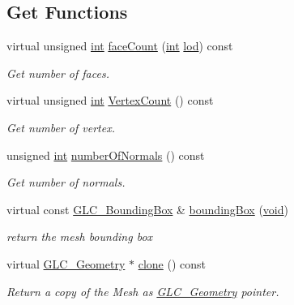 \subsection*{Get Functions}
\begin{DoxyCompactItemize}
\item 
virtual unsigned \hyperlink{ioapi_8h_a787fa3cf048117ba7123753c1e74fcd6}{int} \hyperlink{class_g_l_c___mesh_ac2db6e0b14be355770dbe8b815cde6bb}{face\-Count} (\hyperlink{ioapi_8h_a787fa3cf048117ba7123753c1e74fcd6}{int} \hyperlink{glext_8h_a5b5a34b88a28ab9c203c2b432f6168b6}{lod}) const 
\begin{DoxyCompactList}\small\item\em Get number of faces. \end{DoxyCompactList}\item 
virtual unsigned \hyperlink{ioapi_8h_a787fa3cf048117ba7123753c1e74fcd6}{int} \hyperlink{class_g_l_c___mesh_a606b5ce51a2a6221cd3c045399cc878a}{Vertex\-Count} () const 
\begin{DoxyCompactList}\small\item\em Get number of vertex. \end{DoxyCompactList}\item 
unsigned \hyperlink{ioapi_8h_a787fa3cf048117ba7123753c1e74fcd6}{int} \hyperlink{class_g_l_c___mesh_a45d6053a953a7d9b63843efbe70ac64e}{number\-Of\-Normals} () const 
\begin{DoxyCompactList}\small\item\em Get number of normals. \end{DoxyCompactList}\item 
virtual const \hyperlink{class_g_l_c___bounding_box}{G\-L\-C\-\_\-\-Bounding\-Box} \& \hyperlink{class_g_l_c___mesh_ade9265ef9cd3578fc6e4573c95ec2294}{bounding\-Box} (\hyperlink{group___u_a_v_objects_plugin_ga444cf2ff3f0ecbe028adce838d373f5c}{void})
\begin{DoxyCompactList}\small\item\em return the mesh bounding box \end{DoxyCompactList}\item 
virtual \hyperlink{class_g_l_c___geometry}{G\-L\-C\-\_\-\-Geometry} $\ast$ \hyperlink{class_g_l_c___mesh_a2a26cd7b253e0093fde665d98de58be4}{clone} () const 
\begin{DoxyCompactList}\small\item\em Return a copy of the Mesh as \hyperlink{class_g_l_c___geometry}{G\-L\-C\-\_\-\-Geometry} pointer. \end{DoxyCompactList}\item 

\end{DoxyCompactItemize}
